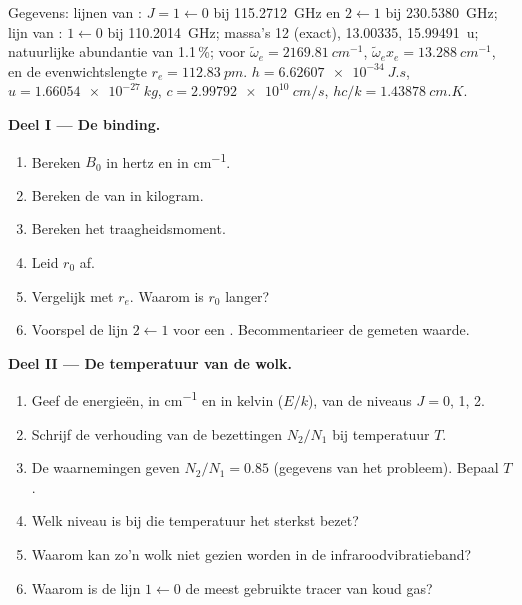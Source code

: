 \begin{problem}
\label{pb:b3:rovibrational-spectroscopy:1}
Gegevens: lijnen van : $J = 1 \leftarrow 0$ bij \qty{115.2712}{GHz} en $2
\leftarrow 1$ bij \qty{230.5380}{GHz}; lijn van : $1 \leftarrow 0$ bij
\qty{110.2014}{GHz}; massa's  12 (exact),  13.00335,
 \qty{15.99491}{u}; natuurlijke abundantie van  1.1\,\%; voor 
$\tilde\omega_e = \qty{2169.81}{cm^{-1}}$, $\tilde\omega_ex_e = \qty{13.288}{cm^{-1}}$, en de
evenwichtslengte $r_e = \qty{112.83}{pm}$. $h = \qty{6.62607e-34}{J.s}$, $u =
\qty{1.66054e-27}{kg}$, $c = \qty{2.99792e10}{cm/s}$, $hc/k = \qty{1.43878}{cm.K}$.

\medskip\noindent\textbf{Deel I --- De binding.}
\begin{enumerate}
  \item Bereken $B_0$ in hertz en in \unit{cm^{-1}}.
  \item Bereken de  van  in kilogram.
  \item Bereken het traagheidsmoment.
  \item Leid $r_0$ af.
  \item Vergelijk met $r_e$. Waarom is $r_0$ langer?
  \item Voorspel de lijn $2 \leftarrow 1$ voor een .
        Becommentarieer de gemeten waarde.
\end{enumerate}

\medskip\noindent\textbf{Deel II --- De temperatuur van de wolk.}
\begin{enumerate}[resume]
  \item Geef de energieën, in \unit{cm^{-1}} en in kelvin ($E/k$), van de niveaus $J =
        0$, 1, 2.
  \item Schrijf de verhouding van de bezettingen $N_2/N_1$ bij temperatuur $T$.
  \item De waarnemingen geven $N_2/N_1 = 0.85$ (gegevens van het probleem).
        Bepaal $T$.
  \item Welk niveau is bij die temperatuur het sterkst bezet?
  \item Waarom kan zo'n wolk niet gezien worden in de infraroodvibratieband?
  \item Waarom is de lijn $1 \leftarrow 0$ de meest gebruikte tracer van koud gas?
\end{enumerate}


\end{problem}
